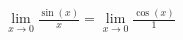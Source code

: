 \documentclass[preview]{standalone}
\begin{document}
\begin{align*}
\lim_{x \to 0} \frac{\sin(x)}{x} = \lim_{x \to 0} \frac{\cos(x)}{1}
\end{align*}
\end{document}
